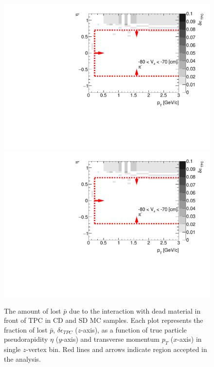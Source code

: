\begin{figure}[H]
	\caption[The amount of lost $\bar{p}$ due to the interaction with dead material in front of TPC as a function of $p_T$, $\eta$ and $z$-vertex in CD and SD]{The amount of lost $\bar{p}$ due to the interaction with dead material in front of TPC in CD and SD MC samples. Each plot represents the fraction of lost $\bar{p}$, $\delta\epsilon_{ TPC}$ ($z$-axis), as a function of true particle pseudorapidity $\eta$ ($y$-axis) and transverse momentum $p_{T}$ ($x$-axis) in single $z$-vertex bin. Red lines and arrows indicate region accepted in the analysis.}\label{fig:dead_materialCDSD3Dpbar}
	\parbox{0.325\textwidth}{
		\includegraphics[width=\linewidth,page=33]{graphics/systematicsEfficiency/deadMaterial/secondaries_Unbinned_SDCD_.pdf}\\
		\includegraphics[width=\linewidth,page=36]{graphics/systematicsEfficiency/deadMaterial/secondaries_Unbinned_SDCD_.pdf}\\
}
\end{figure}
